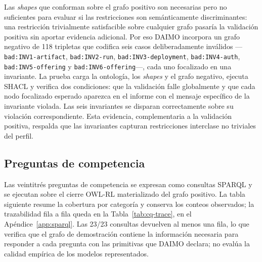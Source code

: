 \documentclass[Afour,sagev,times]{sagej}
\newcommand{\code}[1]{\texttt{#1}}
\begin{document}
Las \emph{shapes} que conforman sobre el grafo positivo son necesarias pero no suficientes para evaluar si las restricciones son semánticamente discriminantes: una restricción trivialmente satisfacible sobre cualquier grafo pasaría la validación positiva sin aportar evidencia adicional. Por eso DAIMO incorpora un grafo negativo de 118 tripletas que codifica seis casos deliberadamente inválidos ---\code{bad:INV1-artifact}, \code{bad:INV2-run}, \code{bad:INV3-deployment}, \code{bad:INV4-auth}, \code{bad:INV5-offering} y \code{bad:INV6-offering}---, cada uno focalizado en una invariante. La prueba carga la ontología, los \emph{shapes} y el grafo negativo, ejecuta SHACL y verifica dos condiciones: que la validación falle globalmente y que cada nodo focalizado esperado aparezca en el informe con el mensaje específico de la invariante violada. Las seis invariantes se disparan correctamente sobre su violación correspondiente. Esta evidencia, complementaria a la validación positiva, respalda que las invariantes capturan restricciones interclase no triviales del perfil.

\subsection{Preguntas de competencia}\label{sec:eval-cqs}

Las veintitrés preguntas de competencia se expresan como consultas SPARQL y se ejecutan sobre el cierre OWL-RL materializado del grafo positivo. La tabla siguiente resume la cobertura por categoría y conserva los conteos observados; la trazabilidad fila a fila queda en la Tabla~\ref{tab:cq-trace}, en el Apéndice~\ref{app:sparql}. Las 23/23 consultas devuelven al menos una fila, lo que verifica que el grafo de demostración contiene la información necesaria para responder a cada pregunta con las primitivas que DAIMO declara; no evalúa la calidad empírica de los modelos representados.
\end{document}
